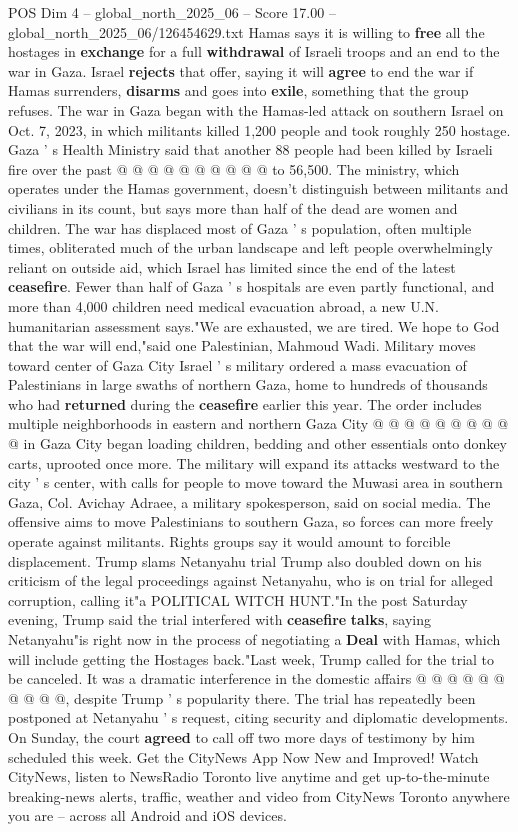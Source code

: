 \begin{textsample}{POS Dim 4 – global\_north\_2025\_06 – Score 17.00 – global\_north\_2025\_06/126454629.txt}
Hamas says it is willing to \textbf{free} all the hostages in \textbf{exchange} for a full \textbf{withdrawal} of Israeli troops and an end to the war in Gaza.
Israel \textbf{rejects} that offer, saying it will \textbf{agree} to end the war if Hamas surrenders, \textbf{disarms} and goes into \textbf{exile}, something that the group refuses.
The war in Gaza began with the Hamas-led attack on southern Israel on Oct. 7, 2023, in which militants killed 1,200 people and took roughly 250 hostage.
Gaza ' s Health Ministry said that another 88 people had been killed by Israeli fire over the past @ @ @ @ @ @ @ @ @ @ to 56,500.
The ministry, which operates under the Hamas government, doesn't distinguish between militants and civilians in its count, but says more than half of the dead are women and children.
The war has displaced most of Gaza ' s population, often multiple times, obliterated much of the urban landscape and left people overwhelmingly reliant on outside aid, which Israel has limited since the end of the latest \textbf{ceasefire}.
Fewer than half of Gaza ' s hospitals are even partly functional, and more than 4,000 children need medical evacuation abroad, a new U.N. humanitarian assessment says."We are exhausted, we are tired.
We hope to God that the war will end,"said one Palestinian, Mahmoud Wadi.
Military moves toward center of Gaza City Israel ' s military ordered a mass evacuation of Palestinians in large swaths of northern Gaza, home to hundreds of thousands who had \textbf{returned} during the \textbf{ceasefire} earlier this year.
The order includes multiple neighborhoods in eastern and northern Gaza City @ @ @ @ @ @ @ @ @ @ in Gaza City began loading children, bedding and other essentials onto donkey carts, uprooted once more.
The military will expand its attacks westward to the city ' s center, with calls for people to move toward the Muwasi area in southern Gaza, Col.
Avichay Adraee, a military spokesperson, said on social media.
The offensive aims to move Palestinians to southern Gaza, so forces can more freely operate against militants.
Rights groups say it would amount to forcible displacement.
Trump slams Netanyahu trial Trump also doubled down on his criticism of the legal proceedings against Netanyahu, who is on trial for alleged corruption, calling it"a POLITICAL WITCH HUNT."In the post Saturday evening, Trump said the trial interfered with \textbf{ceasefire} \textbf{talks}, saying Netanyahu"is right now in the process of negotiating a \textbf{Deal} with Hamas, which will include getting the Hostages back."Last week, Trump called for the trial to be canceled.
It was a dramatic interference in the domestic affairs @ @ @ @ @ @ @ @ @ @, despite Trump ' s popularity there.
The trial has repeatedly been postponed at Netanyahu ' s request, citing security and diplomatic developments.
On Sunday, the court \textbf{agreed} to call off two more days of testimony by him scheduled this week.
Get the CityNews App Now New and Improved!
Watch CityNews, listen to NewsRadio Toronto live anytime and get up-to-the-minute breaking-news alerts, traffic, weather and video from CityNews Toronto anywhere you are -- across all Android and iOS devices.


\end{textsample}
